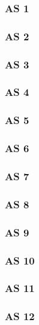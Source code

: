 \subsubsection{AS 1}

\subsubsection{AS 2}

\subsubsection{AS 3}

\subsubsection{AS 4}

\subsubsection{AS 5}

\subsubsection{AS 6}

\subsubsection{AS 7}

\subsubsection{AS 8}

\subsubsection{AS 9}

\subsubsection{AS 10}

\subsubsection{AS 11}

\subsubsection{AS 12}

